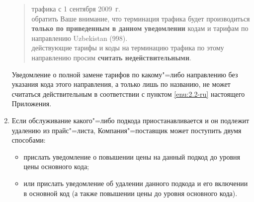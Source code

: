 \begin{Form}
\begin{enumerate}[label=\thesection.\arabic*.]
\begin{quote}
\begin{flushleft}
{        трафика с 1 сентября 2009~г.\\
         обратить Ваше внимание, что терминация трафика будет производиться
        \textbf{только по приведенным в данном уведомлении} кодам и тарифам по направлению
        Uzbekistan (998).\\
         действующие тарифы и коды на терминацию трафика по этому направлению
        просим \textbf{считать недействительными}}.\\
    \end{flushleft}
  \end{quote}
    Уведомление о полной замене тарифов по какому"=либо направлению без
    указания кода этого направления, а только лишь по названию, не может
    считаться действительным в соответствии с пунктом \ref{enu:2.2-ru} настоящего
    Приложения. 
    
  \item Если обслуживание какого"=либо подкода приостанавливается и он подлежит
    удалению из прайс"=листа, Компания"=поставщик может поступить двумя
    способами: 
    
    \begin{itemize}
    \item прислать уведомление о повышении цены на данный подкод до уровня цены
      основного кода; 
    \item или прислать уведомление об удалении данного подкода и его включении
      в основной код (а также повышении цены до уровня основного кода). 
    \end{itemize}


\end{enumerate}
\end{Form}
